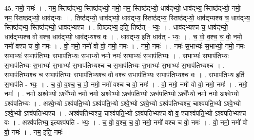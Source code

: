 \documentclass[17pt]{extarticle}
\begin{document}
45. नमो॒ नमः॑ । . नम॒ स्तिष्ठ॑द्भ्य॒ स्तिष्ठ॑द्भ्यो॒ नमो॒ नम॒ स्तिष्ठ॑द्भ्यो॒ धाव॑द्भ्यो॒ धाव॑द्भ्य॒ स्तिष्ठ॑द्भ्यो॒ नमो॒ नम॒ स्तिष्ठ॑द्भ्यो॒ धाव॑द्भ्यः । . तिष्ठ॑द्भ्यो॒ धाव॑द्भ्यो॒ धाव॑द्भ्य॒ स्तिष्ठ॑द्भ्य॒ स्तिष्ठ॑द्भ्यो॒ धाव॑द्भ्यश्च च॒ धाव॑द्भ्य॒ स्तिष्ठ॑द्भ्य॒ स्तिष्ठ॑द्भ्यो॒ धाव॑द्भ्यश्च । . तिष्ठ॑द्भ्य॒ इति॒ तिष्ठ॑त् - भ्यः॒ । . धाव॑द्भ्यश्च च॒ धाव॑द्भ्यो॒ धाव॑द्भ्यश्च वो वश्च॒ धाव॑द्भ्यो॒ धाव॑द्भ्यश्च वः । . धाव॑द्भ्य॒ इति॒ धाव॑त् - भ्यः॒ । . च॒ वो॒ व॒श्च॒ च॒ वो॒ नमो॒ नमो॑ वश्च च वो॒ नमः॑ । . वो॒ नमो॒ नमो॑ वो वो॒ नमो॒ नमः॑ । . नमो॒ नमः॑ । . नमः॑ स॒भाभ्यः॑ स॒भाभ्यो॒ नमो॒ नमः॑ स॒भाभ्यः॑ स॒भाप॑तिभ्यः स॒भाप॑तिभ्यः स॒भाभ्यो॒ नमो॒ नमः॑ स॒भाभ्यः॑ स॒भाप॑तिभ्यः । . स॒भाभ्यः॑ स॒भाप॑तिभ्यः स॒भाप॑तिभ्यः स॒भाभ्यः॑ स॒भाभ्यः॑ स॒भाप॑तिभ्यश्च च स॒भाप॑तिभ्यः स॒भाभ्यः॑ स॒भाभ्यः॑ स॒भाप॑तिभ्यश्च । . स॒भाप॑तिभ्यश्च च स॒भाप॑तिभ्यः स॒भाप॑तिभ्यश्च वो वश्च स॒भाप॑तिभ्यः स॒भाप॑तिभ्यश्च वः । . स॒भाप॑तिभ्य॒ इति॑ स॒भाप॑ति - भ्यः॒ । . च॒ वो॒ व॒श्च॒ च॒ वो॒ नमो॒ नमो॑ वश्च च वो॒ नमः॑ । . वो॒ नमो॒ नमो॑ वो वो॒ नमो॒ नमः॑ । . नमो॒ नमः॑ । . नमो॒ अश्वे॒भ्यो ऽश्वे᳚भ्यो॒ नमो॒ नमो॒ अश्वे॒भ्यो ऽश्व॑पति॒भ्यो ऽश्व॑पति॒भ्यो ऽश्वे᳚भ्यो॒ नमो॒ नमो॒ अश्वे॒भ्यो ऽश्व॑पतिभ्यः । . अश्वे॒भ्यो ऽश्व॑पति॒भ्यो ऽश्व॑पति॒भ्यो ऽश्वे॒भ्यो ऽश्वे॒भ्यो ऽश्व॑पतिभ्यश्च॒ चाश्व॑पति॒भ्यो ऽश्वे॒भ्यो ऽश्वे॒भ्यो ऽश्व॑पतिभ्यश्च । . अश्व॑पतिभ्यश्च॒ चाश्व॑पति॒भ्यो ऽश्व॑पतिभ्यश्च वो व॒ श्चाश्व॑पति॒भ्यो ऽश्व॑पतिभ्यश्च वः । . अश्व॑पतिभ्य॒ इत्यश्व॑पति - भ्यः॒ । . च॒ वो॒ व॒श्च॒ च॒ वो॒ नमो॒ नमो॑ वश्च च वो॒ नमः॑ । . वो॒ नमो॒ नमो॑ वो वो॒ नमः॑ । . नम॒ इति॒ नमः॑ । \newline
\pagebreak
{}
\end{document}
